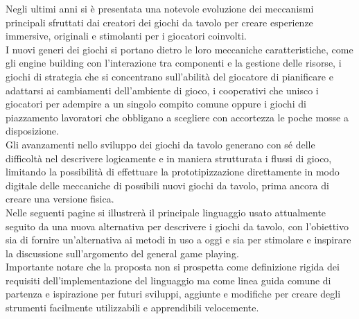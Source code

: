 Negli ultimi anni si è presentata una notevole evoluzione dei meccanismi principali sfruttati dai creatori
dei giochi da tavolo per creare esperienze immersive, originali e stimolanti  per i giocatori coinvolti. \\
I nuovi generi dei giochi si portano dietro le loro meccaniche caratteristiche,
come gli engine building con l’interazione tra componenti e la gestione delle risorse,
i giochi di strategia che si concentrano sull’abilità del giocatore di pianificare e adattarsi ai cambiamenti dell’ambiente di gioco, 
i cooperativi che unisco i giocatori per adempire a un singolo compito comune oppure i giochi di piazzamento lavoratori 
che obbligano a scegliere con accortezza le poche mosse a disposizione. \\
Gli avanzamenti nello sviluppo dei giochi da tavolo generano con sé delle difficoltà nel descrivere logicamente 
e in maniera strutturata i flussi di gioco, limitando la possibilità di effettuare la prototipizzazione 
direttamente in modo digitale delle meccaniche di possibili nuovi giochi da tavolo, prima ancora di creare una versione fisica. \\
Nelle seguenti pagine si illustrerà il principale linguaggio usato attualmente seguito da una nuova alternativa 
per descrivere i giochi da tavolo, con l’obiettivo sia di fornire un’alternativa ai metodi in uso a oggi 
e sia per stimolare e inspirare la discussione sull’argomento del general game playing. \\
Importante notare che la proposta non si prospetta come definizione rigida dei requisiti dell’implementazione del linguaggio 
ma come linea guida comune di partenza e ispirazione per futuri sviluppi, 
aggiunte e modifiche per creare degli strumenti facilmente utilizzabili e apprendibili velocemente. \\

